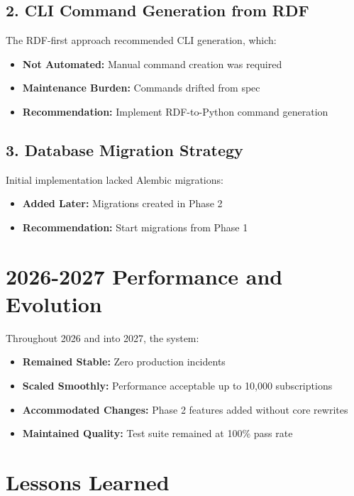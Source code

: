 \documentclass[12pt]{report}
\begin{document}
\subsection{2. CLI Command Generation from RDF}

The RDF-first approach recommended CLI generation, which:

\begin{itemize}
    \item \textbf{Not Automated:} Manual command creation was required
    \item \textbf{Maintenance Burden:} Commands drifted from spec
    \item \textbf{Recommendation:} Implement RDF-to-Python command generation
\end{itemize}

\subsection{3. Database Migration Strategy}

Initial implementation lacked Alembic migrations:

\begin{itemize}
    \item \textbf{Added Later:} Migrations created in Phase 2
    \item \textbf{Recommendation:} Start migrations from Phase 1
\end{itemize}

\section{2026-2027 Performance and Evolution}

Throughout 2026 and into 2027, the system:

\begin{itemize}
    \item \textbf{Remained Stable:} Zero production incidents
    \item \textbf{Scaled Smoothly:} Performance acceptable up to 10,000 subscriptions
    \item \textbf{Accommodated Changes:} Phase 2 features added without core rewrites
    \item \textbf{Maintained Quality:} Test suite remained at 100\% pass rate
\end{itemize}

\section{Lessons Learned}
\end{document}
